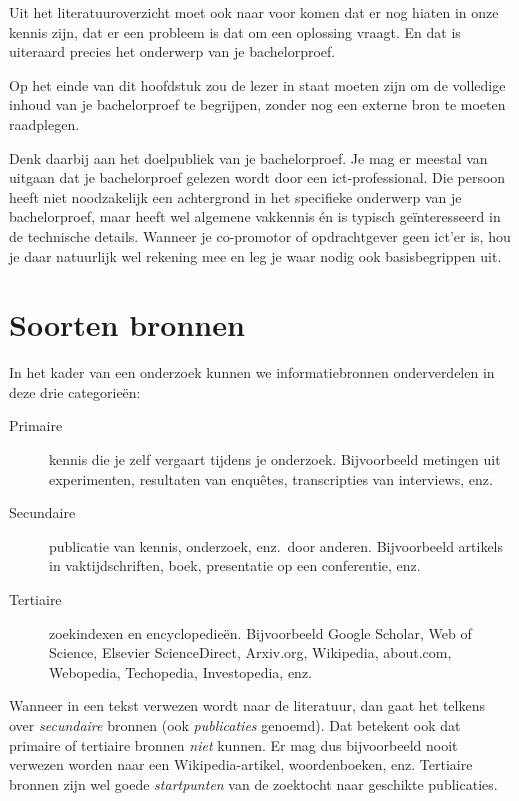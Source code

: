 Uit het literatuuroverzicht moet ook naar voor komen dat er nog hiaten in onze kennis zijn, dat er een probleem is dat om een oplossing vraagt. En dat is uiteraard precies het onderwerp van je bachelorproef.

Op het einde van dit hoofdstuk zou de lezer in staat moeten zijn om de volledige inhoud van je bachelorproef te begrijpen, zonder nog een externe bron te moeten raadplegen. 

Denk daarbij aan het doelpubliek van je bachelorproef. Je mag er meestal van uitgaan dat je bachelorproef gelezen wordt door een ict-professional. Die persoon heeft niet noodzakelijk een achtergrond in het specifieke onderwerp van je bachelorproef, maar heeft wel algemene vakkennis én is typisch geïnteresseerd in de technische details. Wanneer je co-promotor of opdrachtgever geen ict'er is, hou je daar natuurlijk wel rekening mee en leg je waar nodig ook basisbegrippen uit.

\section{Soorten bronnen}%
\label{sec:soorten-bronnen}

In het kader van een onderzoek kunnen we informatiebronnen onderverdelen in deze drie categorieën:

\begin{description}
  \item[Primaire] kennis die je zelf vergaart tijdens je onderzoek. Bijvoorbeeld metingen uit experimenten, resultaten van enquêtes, transcripties van interviews, enz.
  \item[Secundaire] publicatie van kennis, onderzoek, enz.~door anderen. Bijvoorbeeld artikels in vaktijdschriften, boek, presentatie op een conferentie, enz.
  \item[Tertiaire] zoekindexen en encyclopedieën. Bijvoorbeeld Google Scholar, Web of Science, Elsevier ScienceDirect, Arxiv.org, Wikipedia, about.com, Webopedia, Techopedia, Investopedia, enz.
\end{description}

Wanneer in een tekst verwezen wordt naar de literatuur, dan gaat het telkens over \emph{secundaire} bronnen (ook \emph{publicaties} genoemd). Dat betekent ook dat primaire of tertiaire bronnen \emph{niet} kunnen. Er mag dus bijvoorbeeld nooit verwezen worden naar een Wikipedia-artikel, woordenboeken, enz. Tertiaire bronnen zijn wel goede \textit{startpunten} van de zoektocht naar geschikte publicaties.

